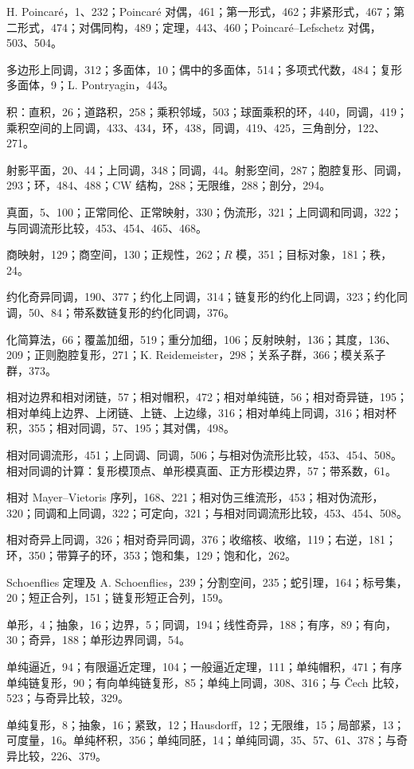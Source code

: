 H. Poincaré，1、232；Poincaré 对偶，461；第一形式，462；非紧形式，467；第二形式，474；对偶同构，489；定理，443、460；Poincaré--Lefschetz 对偶，503、504。

多边形上同调，312；多面体，10；偶中的多面体，514；多项式代数，484；复形多面体，9；L. Pontryagin，443。

积：直积，26；道路积，258；乘积邻域，503；球面乘积的环，440，同调，419；乘积空间的上同调，433、434，环，438，同调，419、425，三角剖分，122、271。

射影平面，20、44；上同调，348；同调，44。射影空间，287；胞腔复形、同调，293；环，484、488；CW 结构，288；无限维，288；剖分，294。

真面，5、100；正常同伦、正常映射，330；伪流形，321；上同调和同调，322；与同调流形比较，453、454、465、468。

商映射，129；商空间，130；正规性，262；$R$ 模，351；目标对象，181；秩，24。

约化奇异同调，190、377；约化上同调，314；链复形的约化上同调，323；约化同调，50、84；带系数链复形的约化同调，376。

化简算法，66；覆盖加细，519；重分加细，106；反射映射，136；其度，136、209；正则胞腔复形，271；K. Reidemeister，298；关系子群，366；模关系子群，373。

相对边界和相对闭链，57；相对帽积，472；相对单纯链，56；相对奇异链，195；相对单纯上边界、上闭链、上链、上边缘，316；相对单纯上同调，316；相对杯积，355；相对同调，57、195；其对偶，498。

相对同调流形，451；上同调、同调，506；与相对伪流形比较，453、454、508。相对同调的计算：复形模顶点、单形模真面、正方形模边界，57；带系数，61。

相对 Mayer--Vietoris 序列，168、221；相对伪三维流形，453；相对伪流形，320；同调和上同调，322；可定向，321；与相对同调流形比较，453、454、508。

相对奇异上同调，326；相对奇异同调，376；收缩核、收缩，119；右逆，181；环，350；带算子的环，353；饱和集，129；饱和化，262。

Schoenflies 定理及 A. Schoenflies，239；分割空间，235；蛇引理，164；标号集，20；短正合列，151；链复形短正合列，159。

单形，4；抽象，16；边界，5；同调，194；线性奇异，188；有序，89；有向，30；奇异，188；单形边界同调，54。

单纯逼近，94；有限逼近定理，104；一般逼近定理，111；单纯帽积，471；有序单纯链复形，90；有向单纯链复形，85；单纯上同调，308、316；与 Čech 比较，523；与奇异比较，329。

单纯复形，8；抽象，16；紧致，12；Hausdorff，12；无限维，15；局部紧，13；可度量，16。单纯杯积，356；单纯同胚，14；单纯同调，35、57、61、378；与奇异比较，226、379。

